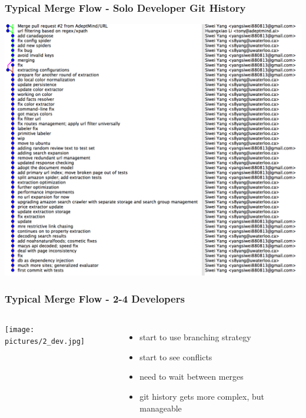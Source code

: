 \documentclass{beamer}
\begin{document}
\begin{frame}
\frametitle{Typical Merge Flow - Solo Developer Git History}
        \includegraphics[scale=0.18]{pictures/solo_git.png}
\end{frame}



\begin{frame}
\frametitle{Typical Merge Flow - 2-4 Developers}

\begin{columns}
        \texttt{[image: pictures/2\_dev.jpg]}
        \begin{itemize}
            \item start to use branching strategy
            \item start to see conflicts
            \item need to wait between merges
            \item git history gets more complex, but manageable
        \end{itemize}
\end{columns}
\end{frame}
\end{document}
